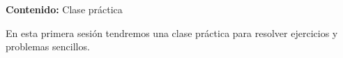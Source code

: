 {\Large\textbf{Contenido:} Clase práctica}

En esta primera sesión tendremos una clase práctica para resolver ejercicios y problemas sencillos.